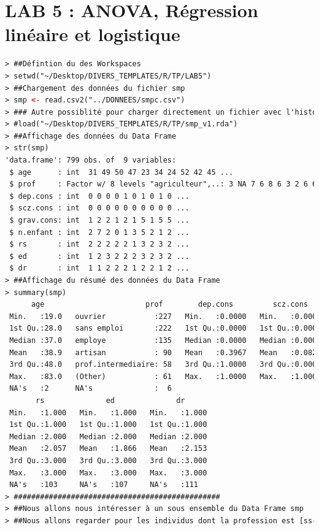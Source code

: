 \section{LAB 5 : ANOVA, Régression linéaire et logistique}
\begin{lstlisting}[language=html]
> ##Défintion du des Workspaces
> setwd("~/Desktop/DIVERS_TEMPLATES/R/TP/LAB5")
> ##Chargement des données du fichier smp
> smp <- read.csv2("../DONNEES/smpc.csv")
> ### Autre possiblité pour charger directement un fichier avec l'historique des modification :
> #load("~/Desktop/DIVERS_TEMPLATES/R/TP/smp_v1.rda")
> ##Affichage des données du Data Frame
> str(smp)
'data.frame': 799 obs. of  9 variables:
 $ age      : int  31 49 50 47 23 34 24 52 42 45 ...
 $ prof     : Factor w/ 8 levels "agriculteur",..: 3 NA 7 6 8 6 3 2 6 6 ...
 $ dep.cons : int  0 0 0 0 1 0 1 0 1 0 ...
 $ scz.cons : int  0 0 0 0 0 0 0 0 0 0 ...
 $ grav.cons: int  1 2 2 1 2 1 5 1 5 5 ...
 $ n.enfant : int  2 7 2 0 1 3 5 2 1 2 ...
 $ rs       : int  2 2 2 2 2 1 3 2 3 2 ...
 $ ed       : int  1 2 3 2 2 2 3 2 3 2 ...
 $ dr       : int  1 1 2 2 2 1 2 2 1 2 ...
> ##Affichage du résumé des données du Data Frame
> summary(smp)
      age                       prof        dep.cons         scz.cons        grav.cons        n.enfant     
 Min.   :19.0   ouvrier           :227   Min.   :0.0000   Min.   :0.0000   Min.   :1.000   Min.   : 0.000  
 1st Qu.:28.0   sans emploi       :222   1st Qu.:0.0000   1st Qu.:0.0000   1st Qu.:2.000   1st Qu.: 0.000  
 Median :37.0   employe           :135   Median :0.0000   Median :0.0000   Median :4.000   Median : 1.000  
 Mean   :38.9   artisan           : 90   Mean   :0.3967   Mean   :0.0826   Mean   :3.643   Mean   : 1.755  
 3rd Qu.:48.0   prof.intermediaire: 58   3rd Qu.:1.0000   3rd Qu.:0.0000   3rd Qu.:5.000   3rd Qu.: 3.000  
 Max.   :83.0   (Other)           : 61   Max.   :1.0000   Max.   :1.0000   Max.   :7.000   Max.   :13.000  
 NA's   :2      NA's              :  6                                     NA's   :4       NA's   :26      
       rs              ed              dr       
 Min.   :1.000   Min.   :1.000   Min.   :1.000  
 1st Qu.:1.000   1st Qu.:1.000   1st Qu.:1.000  
 Median :2.000   Median :2.000   Median :2.000  
 Mean   :2.057   Mean   :1.866   Mean   :2.153  
 3rd Qu.:3.000   3rd Qu.:3.000   3rd Qu.:3.000  
 Max.   :3.000   Max.   :3.000   Max.   :3.000  
 NA's   :103     NA's   :107     NA's   :111    
> ###############################################
> ##Nous allons nous intéresser à un sous ensemble du Data Frame smp
> ##Nous allons regarder pour les individus dont la profession est [ss-emploi & cadre & profession intermédiaire], l'âge et le nombre d'enfant :

\end{lstlisting}
